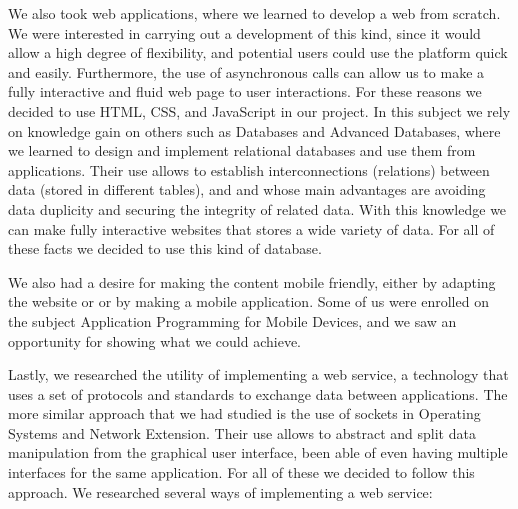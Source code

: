 We also took web applications, where we learned to develop a web from scratch. We were interested in carrying out a development of this kind, since it would allow a high degree of flexibility, and potential users could use the platform quick and easily. Furthermore, the use of asynchronous calls can allow us to make a fully interactive and fluid web page to user interactions. For these reasons we decided to use HTML, CSS, and JavaScript in our project. In this subject we rely on knowledge gain on others such as Databases and Advanced Databases, where we learned to design and implement relational databases and use them from applications. Their use allows to establish interconnections (relations) between data (stored in different tables), and and whose main advantages are avoiding data duplicity and securing the integrity of related data. With this knowledge we can make fully interactive websites that stores a wide variety of data. For all of these facts we decided to use this kind of database.  

We also had a desire for making the content mobile friendly, either by adapting the website or or by making a mobile application. Some of us were enrolled on the subject Application Programming for Mobile Devices, and we saw an opportunity for showing what we could achieve.  

Lastly, we researched the utility of implementing a web service, a technology that uses a set of protocols and standards to exchange data between applications. The more similar approach that we had studied is the use of sockets in Operating Systems and Network Extension. Their use allows to abstract and split data manipulation from the graphical user interface, been able of even having multiple interfaces for the same application. For all of these we decided to follow this approach. We researched several ways of implementing a web service:

